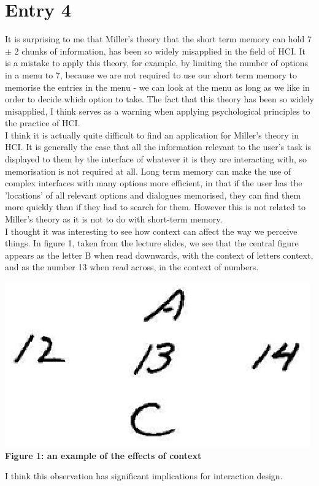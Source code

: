 \documentclass{article}
\begin{document}
\section*{Entry 4}

\noindent It is surprising to me that Miller's theory that the short term memory can hold 7 $\pm$ 2 chunks of information, has been so widely misapplied in the field of HCI. It is a mistake to apply this theory, for example, by limiting the number of options in a menu to 7, because we are not required to use our short term memory to memorise the entries in the menu - we can look at the menu as long as we like in order to decide which option to take. The fact that this theory has been so widely misapplied, I think serves as a warning when applying psychological principles to the practice of HCI.
\\\indent I think it is actually quite difficult to find an application for Miller's theory in HCI. It is generally the case that all the information relevant to the user's task is displayed to them by the interface of whatever it is they are interacting with, so memorisation is not required at all. Long term memory can make the use of complex interfaces with many options more efficient, in that if the user has the 'locations' of all relevant options and dialogues memorised, they can find them more quickly than if they had to search for them. However this is not related to Miller's theory as it is not to do with short-term memory.
\\\indent I thought it was interesting to see how context can affect the way we perceive things. In figure 1, taken from the lecture slides, we see that the central figure appears as the letter B when read downwards, with the context of letters context, and as the number 13 when read across, in the context of numbers.
\\\begin{center}\includegraphics{context}\\\textbf{Figure 1: an example of the effects of context}\end{center}
I think this observation has significant implications for interaction design.
\end{document}
